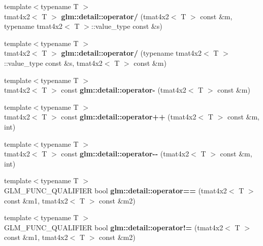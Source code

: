 \begin{DoxyCompactItemize}
\item 
\hypertarget{namespaceglm_1_1detail_a8b354057ea77e5f5ce1940151cee718f}{{\footnotesize template$<$typename T $>$ }\\tmat4x2$<$ \-T $>$ {\bfseries glm\-::detail\-::operator/} (tmat4x2$<$ \-T $>$ const \&m, typename tmat4x2$<$ \-T $>$\-::value\-\_\-type const \&s)}\label{namespaceglm_1_1detail_a8b354057ea77e5f5ce1940151cee718f}

\item 
\hypertarget{namespaceglm_1_1detail_ab26a5682491d3b048d916a70b34bcde1}{{\footnotesize template$<$typename T $>$ }\\tmat4x2$<$ \-T $>$ {\bfseries glm\-::detail\-::operator/} (typename tmat4x2$<$ \-T $>$\-::value\-\_\-type const \&s, tmat4x2$<$ \-T $>$ const \&m)}\label{namespaceglm_1_1detail_ab26a5682491d3b048d916a70b34bcde1}

\item 
\hypertarget{namespaceglm_1_1detail_a13ae05a52a19bc18756601a592ace104}{{\footnotesize template$<$typename T $>$ }\\tmat4x2$<$ \-T $>$ const {\bfseries glm\-::detail\-::operator-\/} (tmat4x2$<$ \-T $>$ const \&m)}\label{namespaceglm_1_1detail_a13ae05a52a19bc18756601a592ace104}

\item 
\hypertarget{namespaceglm_1_1detail_ab59b3fd967c698fa3ad4fdf107b03fc0}{{\footnotesize template$<$typename T $>$ }\\tmat4x2$<$ \-T $>$ const {\bfseries glm\-::detail\-::operator++} (tmat4x2$<$ \-T $>$ const \&m, int)}\label{namespaceglm_1_1detail_ab59b3fd967c698fa3ad4fdf107b03fc0}

\item 
\hypertarget{namespaceglm_1_1detail_a692c5eb7c02d00761c40785ff5876edc}{{\footnotesize template$<$typename T $>$ }\\tmat4x2$<$ \-T $>$ const {\bfseries glm\-::detail\-::operator-\/-\/} (tmat4x2$<$ \-T $>$ const \&m, int)}\label{namespaceglm_1_1detail_a692c5eb7c02d00761c40785ff5876edc}

\item 
\hypertarget{namespaceglm_1_1detail_a5b244ed973691f786c1669f993544002}{{\footnotesize template$<$typename T $>$ }\\\-G\-L\-M\-\_\-\-F\-U\-N\-C\-\_\-\-Q\-U\-A\-L\-I\-F\-I\-E\-R bool {\bfseries glm\-::detail\-::operator==} (tmat4x2$<$ \-T $>$ const \&m1, tmat4x2$<$ \-T $>$ const \&m2)}\label{namespaceglm_1_1detail_a5b244ed973691f786c1669f993544002}

\item 
\hypertarget{namespaceglm_1_1detail_a10d1b000b2e24547882c48dc1d479eed}{{\footnotesize template$<$typename T $>$ }\\\-G\-L\-M\-\_\-\-F\-U\-N\-C\-\_\-\-Q\-U\-A\-L\-I\-F\-I\-E\-R bool {\bfseries glm\-::detail\-::operator!=} (tmat4x2$<$ \-T $>$ const \&m1, tmat4x2$<$ \-T $>$ const \&m2)}\label{namespaceglm_1_1detail_a10d1b000b2e24547882c48dc1d479eed}

\end{DoxyCompactItemize}


